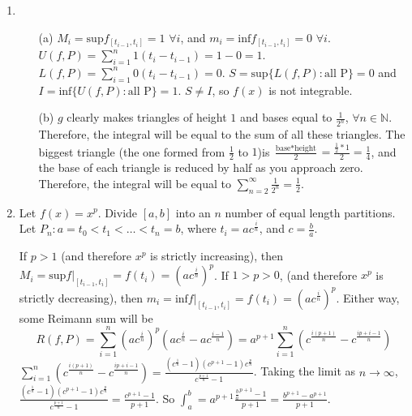 \documentclass[10pt,english]{article}
\begin{document}
\begin{enumerate}
\item \begin{enumerate}
    \item [(a)] $M_i=\text{sup}f_{[t_{i-1},t_i]}=1$ $\forall i$, and $m_i=\text{inf}f_{[t_{i-1},t_i]}=0$ $\forall i$. $U(f,P)=\sum_{i=1}^n1(t_i-t_{i-1})=1-0=1$. $L(f,P)=\sum_{i=1}^n0(t_i-t_{i-1})=0$. $S=\text{sup}\{L(f,P): \text{all P}\}=0$ and $I=\text{inf}\{U(f,P): \text{all P}\}=1$. $S\neq I$, so $f(x)$ is not integrable. 
    \item [(b)] $g$ clearly makes triangles of height $1$ and bases equal to $\frac{1}{2^n}$, $\forall n\in\mathbb{N}$. Therefore, the integral will be equal to the sum of all these triangles. The biggest triangle (the one formed from $\frac{1}{2}$ to $1$)is $\frac{\text{base}*\text{height}}{2}=\frac{\frac{1}{2}*1}{2}=\frac{1}{4}$, and the base of each triangle is reduced by half as you approach zero. Therefore, the integral will be equal to $\sum_{n=2}^\infty\frac{1}{2^n}=\frac{1}{2}$. 
\end{enumerate}


\item Let $f(x)=x^p$. Divide $[a,b]$ into an $n$ number of equal length partitions. Let $P_n:a=t_0<t_1<\ldots<t_n=b$, where $t_i=ac^{\frac{i}{n}}$, and $c=\frac{b}{a}$. 

If $p>1$ (and therefore $x^p$ is strictly increasing), then $M_i=\text{sup}f|_{[t_{i-1},t_i]}=f(t_i)=(ac^\frac{i}{n})^p$. If $1>p>0$, (and therefore $x^p$ is strictly decreasing), then $m_i=\text{inf}f|_{[t_{i-1},t_i]}=f(t_i)=(ac^\frac{i}{n})^p$. Either way, some Reimann sum will be $$R(f,P)=\sum_{i=1}^n(ac^\frac{i}{n})^p(ac^\frac{i}{n}-ac^\frac{i-1}{n})=a^{p+1}\sum_{i=1}^n(c^\frac{i(p+1)}{n}-c^\frac{ip+i-1}{n})$$ $\sum_{i=1}^n(c^\frac{i(p+1)}{n}-c^\frac{ip+i-1}{n})=\frac{(c^\frac{1}{n}-1)(c^{p+1}-1)c^\frac{p}{n}}{c^\frac{p+1}{n}-1}$. Taking the limit as $n\rightarrow\infty$, $\frac{(c^\frac{1}{n}-1)(c^{p+1}-1)c^\frac{p}{n}}{c^\frac{p+1}{n}-1}=\frac{c^{p+1}-1}{p+1}$. So $\int_a^b=a^{p+1}\frac{\frac{b}{a}^{p+1}-1}{p+1}=\frac{b^{p+1}-a^{p+1}}{p+1}$. 

\end{enumerate}
\end{document}
